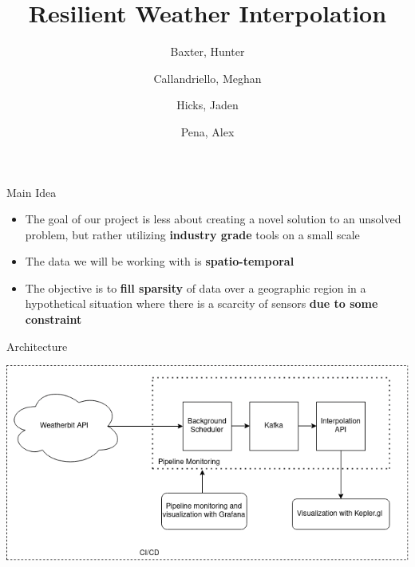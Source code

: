 \documentclass{beamer}
\title{Resilient Weather Interpolation}
\author{
    Baxter, Hunter %
    \and
    Callandriello, Meghan
    \and
    Hicks, Jaden
    \and
    Pena, Alex
}
\begin{document}
\maketitle

\begin{frame}{Main Idea}
\begin{itemize}
    \item The goal of our project is less about creating a novel solution to an unsolved problem,
    but rather utilizing \textbf{industry grade} tools on a small scale
    \item The data we will be working with is \textbf{spatio-temporal}
    \item The objective is to \textbf{fill sparsity} of data over a geographic region in a hypothetical situation where there is a scarcity of sensors \textbf{due to some constraint}
\end{itemize}
\end{frame}

\begin{frame}{Architecture}
\begin{center}
    \includegraphics[width=\linewidth]{figures/architecture.png}
\end{center}
\end{frame}
\end{document}
